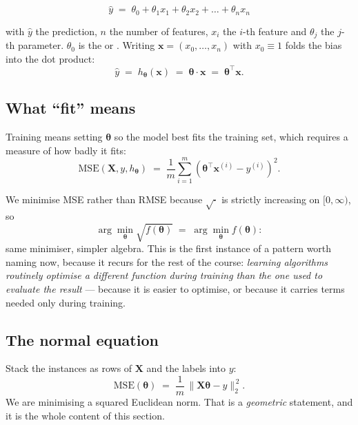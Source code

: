 \documentclass[11pt,a4paper]{article}
\begin{document}
\[ \hat{y} \;=\; \theta_0 + \theta_1 x_1 + \theta_2 x_2 + \dots + \theta_n x_n \]

with $\hat y$ the prediction, $n$ the number of features, $x_i$ the $i$-th
feature and $\theta_j$ the $j$-th parameter. $\theta_0$ is the  or
. Writing $\mathbf{x} = (x_0, \dots, x_n)$ with $x_0 \equiv 1$
folds the bias into the dot product:
\[ \hat{y} \;=\; h_{\boldsymbol\theta}(\mathbf{x}) \;=\;
   \boldsymbol\theta \cdot \mathbf{x} \;=\;
   \boldsymbol\theta^{\intercal}\mathbf{x}. \]

\subsection{What ``fit'' means}

Training means setting $\boldsymbol\theta$ so the model best fits the training
set, which requires a measure of how badly it fits:
\[ \mathrm{MSE}(\mathbf{X}, y, h_{\boldsymbol\theta}) \;=\;
   \frac{1}{m}\sum_{i=1}^{m}
   \left(\boldsymbol\theta^{\intercal}\mathbf{x}^{(i)} - y^{(i)}\right)^{2}. \]

We minimise MSE rather than RMSE because $\sqrt{\cdot}$ is strictly increasing
on $[0,\infty)$, so
\[ \arg\min_{\boldsymbol\theta} \sqrt{f(\boldsymbol\theta)}
   \;=\; \arg\min_{\boldsymbol\theta} f(\boldsymbol\theta): \]
same minimiser, simpler algebra. This is the first instance of a pattern worth
naming now, because it recurs for the rest of the course: \emph{learning
algorithms routinely optimise a different function during training than the one
used to evaluate the result} --- because it is easier to optimise, or because
it carries terms needed only during training.

\subsection{The normal equation}

Stack the instances as rows of $\mathbf{X}$ and the labels into $y$:
\[ \mathrm{MSE}(\boldsymbol\theta) \;=\;
   \frac{1}{m}\,\lVert \mathbf{X}\boldsymbol\theta - y \rVert_2^{\,2}. \]
We are minimising a squared Euclidean norm. That is a \emph{geometric}
statement, and it is the whole content of this section.
\end{document}
